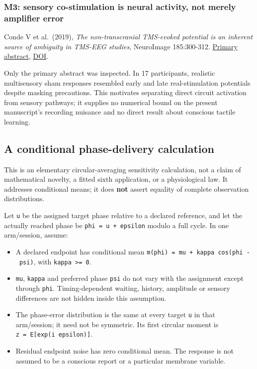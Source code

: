 \documentclass[
  american,
  11pt,
  letterpaper,
]{article}
\providecommand{\tightlist}{%
  \setlength{\itemsep}{0pt}\setlength{\parskip}{0pt}}
\begin{document}
\subsubsection{M3: sensory co-stimulation is neural activity, not merely amplifier error}\label{m3-sensory-co-stimulation-is-neural-activity-not-merely-amplifier-error}

Conde V et al.~(2019), \emph{The non-transcranial TMS-evoked potential is an inherent source of ambiguity in TMS-EEG studies}, NeuroImage 185:300-312. \href{https://pubmed.ncbi.nlm.nih.gov/30347282/}{Primary abstract}, \href{https://doi.org/10.1016/j.neuroimage.2018.10.052}{DOI}.

Only the primary abstract was inspected. In 17 participants, realistic multisensory sham responses resembled early and late real-stimulation potentials despite masking precautions. This motivates separating direct circuit activation from sensory pathways; it supplies no numerical bound on the present manuscript's recording nuisance and no direct result about conscious tactile learning.

\subsection{A conditional phase-delivery calculation}\label{a-conditional-phase-delivery-calculation}

This is an elementary circular-averaging sensitivity calculation, not a claim of mathematical novelty, a fitted sixth application, or a physiological law. It addresses conditional means; it does \textbf{not} assert equality of complete observation distributions.

Let \texttt{u} be the assigned target phase relative to a declared reference, and let the actually reached phase be \texttt{phi\ =\ u\ +\ epsilon} modulo a full cycle. In one arm/session, assume:

\begin{itemize}
\tightlist
\item
  A declared endpoint has conditional mean \texttt{m(phi)\ =\ mu\ +\ kappa\ cos(phi\ -\ psi)}, with \texttt{kappa\ \textgreater{}=\ 0}.
\item
  \texttt{mu}, \texttt{kappa} and preferred phase \texttt{psi} do not vary with the assignment except through \texttt{phi}. Timing-dependent waiting, history, amplitude or sensory differences are not hidden inside this assumption.
\item
  The phase-error distribution is the same at every target \texttt{u} in that arm/session; it need not be symmetric. Its first circular moment is \texttt{z\ =\ E{[}exp(i\ epsilon){]}}.
\item
  Residual endpoint noise has zero conditional mean. The response is not assumed to be a conscious report or a particular membrane variable.
\end{itemize}
\end{document}
